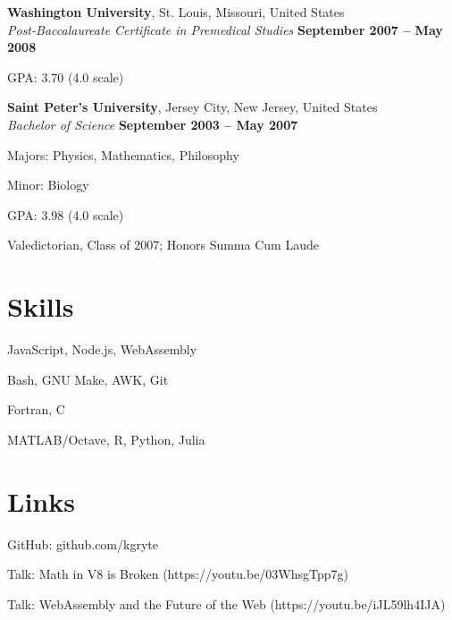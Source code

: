 \documentclass[margin,line]{resume}
\begin{document}
\begin{resume}
	\textbf{Washington University}, St. Louis, Missouri, United States \vspace{1mm}\\
	\textsl{Post-Baccalaureate Certificate in Premedical Studies} \hfill \textbf{ September 2007 -- May 2008} \vspace{1mm}\\
	\vspace{-4mm}
	\begin{list2}
		\item GPA: 3.70 (4.0 scale)
	\end{list2}
	\vspace{-1.5mm}

	\textbf{Saint Peter's University}, Jersey City, New Jersey, United States \vspace{1mm}\\
	\textsl{Bachelor of Science} \hfill \textbf{ September 2003 -- May 2007} \vspace{1mm}\\
	\vspace{-4mm}
	\begin{list2}
		\item Majors: Physics, Mathematics, Philosophy
		\item Minor: Biology
		\item GPA: 3.98 (4.0 scale)
		\item Valedictorian, Class of 2007; Honors Summa Cum Laude
	\end{list2}
	\vspace{-1.5mm}


	\section{\mysidestyle Skills}

	\begin{list2}
		\item JavaScript, Node.js, WebAssembly
		\item Bash, GNU Make, AWK, Git
		\item Fortran, C
		\item MATLAB/Octave, R, Python, Julia
	\end{list2}


	\section{\mysidestyle Links}

	\begin{list2}
		\item GitHub: github.com/kgryte
		\item Talk: Math in V8 is Broken (https://youtu.be/03WhsgTpp7g)
		\item Talk: WebAssembly and the Future of the Web (https://youtu.be/iJL59lh4IJA)
	\end{list2}

\end{resume}
\end{document}
